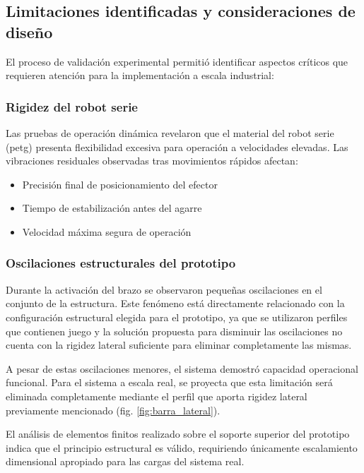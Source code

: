 \subsection{Limitaciones identificadas y consideraciones de diseño}

El proceso de validación experimental permitió identificar aspectos críticos que requieren atención para la implementación a escala industrial:

\subsubsection{Rigidez del robot serie}

Las pruebas de operación dinámica revelaron que el material del robot serie (petg) presenta flexibilidad excesiva para operación a velocidades elevadas. Las vibraciones residuales observadas tras movimientos rápidos afectan:

\begin{itemize}
    \item Precisión final de posicionamiento del efector
    \item Tiempo de estabilización antes del agarre
    \item Velocidad máxima segura de operación
\end{itemize}

\subsubsection{Oscilaciones estructurales del prototipo}

Durante la activación del brazo se observaron pequeñas oscilaciones en el conjunto de la estructura. Este fenómeno está directamente relacionado con la configuración estructural elegida para el prototipo, ya que se utilizaron perfiles que contienen juego y la solución propuesta para disminuir las oscilaciones no cuenta con la rigidez lateral suficiente para eliminar completamente las mismas.

A pesar de estas oscilaciones menores, el sistema demostró capacidad operacional funcional. Para el sistema a escala real, se proyecta que esta limitación será eliminada completamente mediante el perfil que aporta rigidez lateral previamente mencionado (fig. \ref{fig:barra_lateral}).

El análisis de elementos finitos realizado sobre el soporte superior del prototipo indica que el principio estructural es válido, requiriendo únicamente escalamiento dimensional apropiado para las cargas del sistema real.

